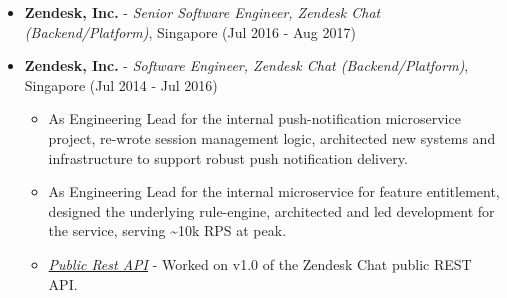 \begin{itemize}
\tightlist
\item
  \textbf{Zendesk, Inc.} - \emph{Senior Software Engineer, Zendesk Chat
  (Backend/Platform)}, Singapore \hfill (Jul 2016 - Aug 2017)
\item
  \textbf{Zendesk, Inc.} - \emph{Software Engineer, Zendesk Chat
  (Backend/Platform)}, Singapore \hfill (Jul 2014 - Jul 2016)

  \begin{itemize}
  \tightlist
  \item
    As Engineering Lead for the internal push-notification microservice
    project, re-wrote session management logic, architected new systems
    and infrastructure to support robust push notification delivery.
  \item
    As Engineering Lead for the internal microservice for feature
    entitlement, designed the underlying rule-engine, architected and
    led development for the service, serving \textasciitilde{}10k RPS at
    peak.
  \item
    \emph{\href{https://developer.zendesk.com/rest_api/docs/chat/introduction}{Public
    Rest API}} - Worked on v1.0 of the Zendesk Chat public REST API.


\end{itemize}
\end{itemize}
